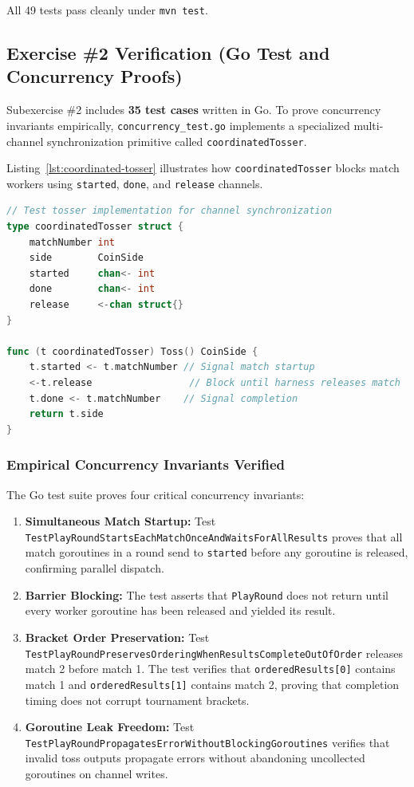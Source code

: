 \documentclass[11pt,a4paper]{article}
\begin{document}
All 49 tests pass cleanly under \texttt{mvn test}.

\subsection{Exercise \#2 Verification (Go Test and Concurrency Proofs)}

Subexercise \#2 includes \textbf{35 test cases} written in Go. To prove concurrency invariants empirically, \texttt{concurrency\_test.go} implements a specialized multi-channel synchronization primitive called \texttt{coordinatedTosser}.

Listing~\ref{lst:coordinated-tosser} illustrates how \texttt{coordinatedTosser} blocks match workers using \texttt{started}, \texttt{done}, and \texttt{release} channels.

\begin{lstlisting}[language=Go, caption={Empirical concurrency test harness in concurrency\_test.go}, label={lst:coordinated-tosser}]
// Test tosser implementation for channel synchronization
type coordinatedTosser struct {
    matchNumber int
    side        CoinSide
    started     chan<- int
    done        chan<- int
    release     <-chan struct{}
}

func (t coordinatedTosser) Toss() CoinSide {
    t.started <- t.matchNumber // Signal match startup
    <-t.release                 // Block until harness releases match
    t.done <- t.matchNumber    // Signal completion
    return t.side
}
\end{lstlisting}

\subsubsection{Empirical Concurrency Invariants Verified}

The Go test suite proves four critical concurrency invariants:
\begin{enumerate}
    \item \textbf{Simultaneous Match Startup:} Test \texttt{TestPlayRoundStarts}\allowbreak\texttt{EachMatchOnceAndWaitsForAllResults} proves that all match goroutines in a round send to \texttt{started} before any goroutine is released, confirming parallel dispatch.
    \item \textbf{Barrier Blocking:} The test asserts that \texttt{PlayRound} does not return until every worker goroutine has been released and yielded its result.
    \item \textbf{Bracket Order Preservation:} Test \texttt{TestPlayRoundPreserves}\allowbreak\texttt{OrderingWhenResultsCompleteOutOfOrder} releases match 2 before match 1. The test verifies that \texttt{orderedResults[0]} contains match 1 and \texttt{orderedResults[1]} contains match 2, proving that completion timing does not corrupt tournament brackets.
    \item \textbf{Goroutine Leak Freedom:} Test \texttt{TestPlayRoundPropagates}\allowbreak\texttt{ErrorWithoutBlockingGoroutines} verifies that invalid toss outputs propagate errors without abandoning uncollected goroutines on channel writes.
\end{enumerate}
\end{document}
